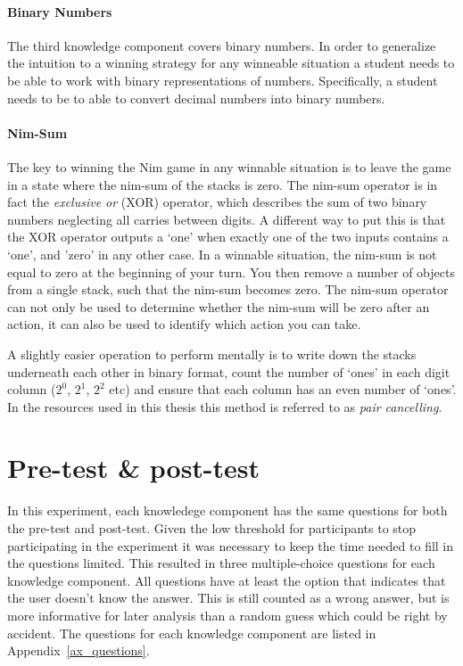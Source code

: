 \paragraph{Binary Numbers} The third knowledge component covers binary numbers.
In order to generalize the intuition to a winning strategy
for any winneable situation a student needs to be able to work with binary
representations of numbers. Specifically, a student needs to be to able to
convert decimal numbers into binary numbers.
\paragraph{Nim-Sum}
The key to winning the Nim game in any winnable situation is to leave the game
in a state where the nim-sum of the stacks is zero. The nim-sum operator is in
fact the \emph{exclusive or} (XOR) operator, which describes the sum of two
binary numbers neglecting all carries between digits. A different way to put
this is that the XOR operator outputs a `one' when exactly one of the two
inputs contains a `one', and 'zero' in any other case. In a winnable situation,
the nim-sum is not equal to zero at the beginning of your turn. You then remove a
number of objects from a single stack, such that the nim-sum becomes zero.
The nim-sum operator can not only be used to determine whether the nim-sum will
be zero after an action, it can also be used to identify which action you can take.

A slightly easier operation to perform mentally is to write down the stacks
underneath each other in binary format, count the number of `ones' in each
digit column ($2^0$, $2^1$, $2^2$ etc) and ensure that each column has an even
number of `ones'. In the resources used in this thesis this method is referred
to as \emph{pair cancelling}.
\section{Pre-test \& post-test}
In this experiment, each knowledege component has the same questions for both
the pre-test and post-test. Given the low threshold for participants to stop
participating in the experiment it was necessary to keep the time needed to
fill in the questions limited. This resulted in three multiple-choice
questions for each knowledge component. All questions have at least the option that
indicates that the user doesn't know the answer. This is still counted as a
wrong answer, but is more informative for later analysis than a random guess
which could be right by accident. The questions for each knowledge component
are listed in Appendix~\ref{ax_questions}.

